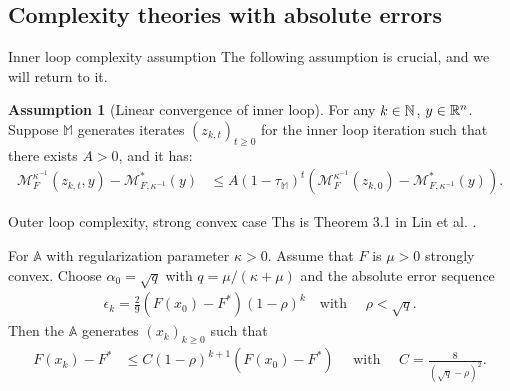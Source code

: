\documentclass[11pt]{beamer}
\theoremstyle{definition}
\newtheorem{assumption}{Assumption}[section]
\begin{document}
    \subsection{Complexity theories with absolute errors}
        \begin{frame}{Inner loop complexity assumption}
            The following assumption is crucial, and we will return to it. 
            \begin{assumption}[Linear convergence of inner loop]\label{ass:linear-convergence-inner-loop}
                For any $k \in \mathbb N$, $y \in \mathbb R^n$. 
                Suppose $\mathbb M$ generates iterates $(z_{k, t})_{t \ge 0}$ for the inner loop iteration such that there exists $A > 0$, and it has: 
                {\small
                \begin{align*}
                    \mathcal M_F^{\kappa^{-1}}(z_{k, t}, y) - \mathcal M^*_{F, \kappa^{-1}}(y) 
                    &\le 
                    A(1 - \tau_{\mathbb M})^t
                    \left(
                        \mathcal M_{F}^{\kappa^{-1}}(z_{k,0})
                        -
                        \mathcal M^*_{F, \kappa^{-1}}(y)
                    \right). 
                \end{align*}
                }
            \end{assumption}
        \end{frame}
        \begin{frame}{Outer loop complexity, strong convex case}
            Ths is Theorem 3.1 in Lin et al. \cite{lin_universal_2015}. 
            \begin{theorem}[]\label{thm:err-seq-outer-s-cnvx}
            {\small
                For $\mathbb A$ with regularization parameter $\kappa > 0$. 
                Assume that $F$ is $\mu > 0$ strongly convex. 
                Choose $\alpha_0 = \sqrt{q}$ with $q = \mu/(\kappa + \mu)$ and the absolute error sequence 
                $$
                \begin{aligned}
                    \epsilon_k = \frac{2}{9}(F(x_0) - F^*)(1 - \rho)^k \quad \text{with }\quad 
                    \rho < \sqrt{q}. 
                \end{aligned}
                $$
                Then the $\mathbb A$ generates $(x_{k})_{k \ge 0}$ such that 
                $$
                \begin{aligned}
                    F(x_k) - F^* &\le 
                    C(1 - \rho)^{k + 1} (F(x_0) - F^*) \quad \text{ with }\quad 
                    C = \frac{8}{(\sqrt{q} - \rho)^2}. 
                \end{aligned}
                $$
            }
            \end{theorem}
        \end{frame}
\end{document}
